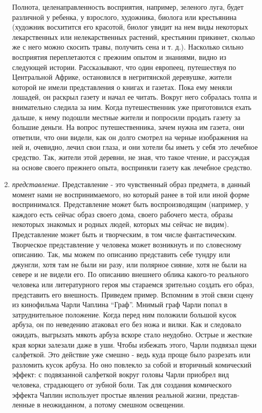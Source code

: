 \documentclass[12pt]{article}
\begin{document}
\begin{enumerate}
	Полнота, целенаправленность восприятия, например, зеленого луга, будет различной у ребенка, у взрослого, художника, биолога или крестьянина (художник восхитится его красотой, биолог увидит на нем виды некоторых лекарственных или нелекарственных растений, крестьянин прикинет, сколько же с него можно скосить травы, получить сена и т. д.).
	Насколько сильно восприятия переплетаются с прежним опы­том и знаниями, видно из следующей истории.
	Рассказывают, что один европеец, путешествуя по Центральной Африке, оста­новился в негритянской деревушке, жители которой не имели представления о книгах и газетах.
	Пока ему меняли лошадей, он раскрыл газету и начал ее читать.
	Вокруг него собралась толпа и внимательно следила за ним.
	Когда путешественник уже приготовился ехать дальше, к нему подошли местные жители и попросили продать газету за большие деньги.
	На вопрос путеше­ственника, зачем нужна им газета, они ответили, что они видели, как он долго смотрел на черные изображения на ней и, очевидно, лечил свои глаза, и они хотели бы иметь у себя это лечебное средство.
	Так, жители этой деревни, не зная, что такое чтение, и рассуждая на основе своего прежнего опыта, восприняли газету как лечебное средство.
\item \textit{представление}.
	Представление - это чувственный образ предмета, в данный момент нами не воспринимаемого, но который ранее в той или иной форме воспринимался.
	Представление может быть воспроизво­дящим (например, у каждого есть сейчас образ своего дома, сво­его рабочего места, образы некоторых знакомых и родных людей, которых мы сейчас не видим).
	Представление может быть и твор­ческим, в том числе фантастическим.
	Творческое представление у человека может возникнуть и по словесному описанию.
	Так, мы можем по описанию представить себе тундру или джунгли, хотя там не были ни разу, или полярное сияние, хотя не были на севере и не видели его.
	По описанию внешнего облика какого-то реального человека или литературного героя мы стараемся зрительно создать его образ, представить его внешность.
	Приведем пример. Вспом­ним в этой связи сцену из кинофильма Чарли Чаплина “Граф”.
	Мнимый граф Чарли попал в затруднительное положение.
	Когда перед ним положили большой кусок арбуза, он по неведению атаковал его без ножа и вилки.
	Как и следовало ожидать, вы­грызать мякоть арбуза вскоре стало неудобно.
	Острые и жест­кие края корки залезали даже в уши.
	Чтобы избежать этого, Чарли подвязал щеки салфеткой.
	Это действие уже смешно - ведь куда проще было разрезать или разломить кусок арбуза.
	Но оно по­влекло за собой и вторичный комический эффект: с подвязанной салфеткой вокруг головы Чарли приобрел вид человека, страда­ющего от зубной боли.
	Так для создания комического эффекта Чаплин использует простые явления реальной жизни, представ­ленные в неожиданном, а потому смешном освещении.
\end{enumerate}
\end{document}
